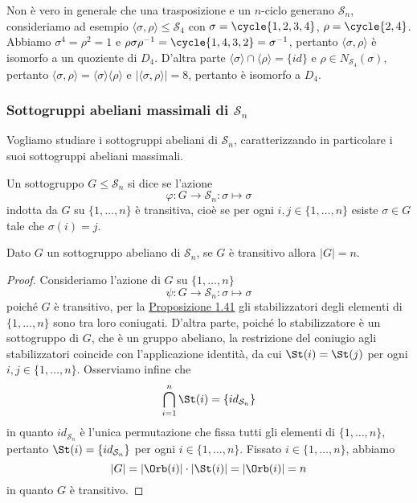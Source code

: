 \documentclass[11pt]{scrartcl}
\begin{document}
\begin{remark}
    Non è vero in generale che una trasposizione e un $n$-ciclo generano $\mathcal{S}_n$,
    consideriamo ad esempio $\langle\sigma, \rho\rangle\leqslant \mathcal{S}_4$ con
    $\sigma = \cycle{1, 2, 3, 4}$, $\rho = \cycle{2, 4}$. Abbiamo
    $\sigma^4 = \rho^2 = 1$ e $\rho\sigma\rho^{-1} = \cycle{1, 4, 3, 2} =
    \sigma^{-1}$, pertanto $\langle\sigma, \rho\rangle$ è isomorfo a un 
    quoziente di $D_4$. D'altra parte $\langle\sigma\rangle\cap \langle\rho\rangle = \{id\}$
    e $\rho \in N_{\mathcal{S}_4}(\sigma)$, pertanto $\langle\sigma, \rho\rangle =
    \langle\sigma\rangle\langle\rho\rangle$ e $|\langle\sigma, \rho\rangle| = 8$,
    pertanto è isomorfo a $D_4$. 
\end{remark}

\subsubsection{Sottogruppi abeliani massimali di $\mathcal{S}_n$}

Vogliamo studiare i sottogruppi abeliani di $\mathcal{S}_n$, caratterizzando in particolare
i suoi sottogruppi abeliani massimali.

\begin{definition}
    Un sottogruppo $G\leqslant \mathcal{S}_n$ si dice  se l'azione
    \[
        \varphi: G\longrightarrow \mathcal{S}_n :\sigma \longmapsto \sigma
    \]indotta da $G$ su $\{1, \ldots, n\}$ è transitiva, cioè se per ogni
    $i, j \in \{1, \ldots, n\}$ esiste $\sigma \in G$ tale che $\sigma(i) = j$.
\end{definition}

\begin{lemma}
    \label{lemma1.54}
    Dato $G$ un sottogruppo abeliano di $\mathcal{S}_n$, se $G$ è transitivo allora $|G| = n$.
\end{lemma}

\begin{proof}
    Consideriamo l'azione di $G$ su $\{1, \ldots, n\}$
    \[
        \psi : G\longrightarrow \mathcal{S}_n :\sigma \longmapsto \sigma
    \]
    poiché $G$ è transitivo, per la \hyperref[prop1.41]{Proposizione 1.41}
    gli stabilizzatori degli elementi di $\{1, \ldots, n\}$ sono tra loro coniugati.
    D'altra parte, poiché lo stabilizzatore è un sottogruppo di $G$, che
    è un gruppo abeliano, la restrizione del coniugio agli
    stabilizzatori coincide con l'applicazione identità, da cui $\St(i) = \St(j)$
    per ogni $i, j \in \{1, \ldots, n\}$. Osserviamo infine che 
    \[
        \bigcap_{i = 1}^n \St(i) = \{id_{\mathcal{S}_n}\}
    \]in quanto $id_{\mathcal{S}_n}$ è l'unica permutazione che fissa tutti gli elementi
    di $\{1, \ldots, n\}$, pertanto $\St(i) = \{id_{\mathcal{S}_n}\}$ per ogni $i \in \{1, \ldots, n\}$.
    Fissato $i \in \{1, \ldots, n\}$, abbiamo 
    \[
        |G| = |\Orb(i)|\cdot|\St(i)| = |\Orb(i)| = n
    \]
    in quanto $G$ è transitivo.
\end{proof}
\end{document}
